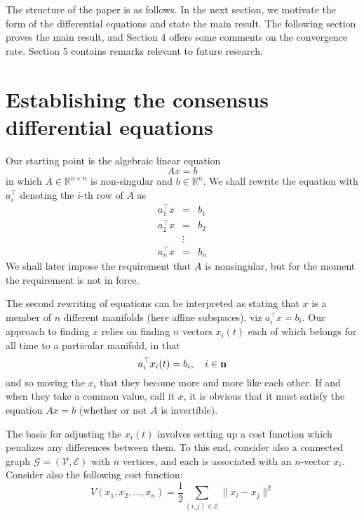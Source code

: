 \documentclass{aims}
\def\n{{\bf n}}
\begin{document}
The structure of the paper is as follows. In the next section, we motivate the form of the differential equations and state the main result.   The following section proves the main result, and Section 4 offers some comments on the convergence rate. Section 5 contains remarks relevant to future research.







\section{Establishing the consensus differential equations}

Our starting point is the algebraic linear equation
\begin{equation}
Ax=b
\end{equation}
in which $A\in\mathbb R^{n\times n}$ is non-singular and $b\in\mathbb R^n$. We shall rewrite the equation with $a_i^{\top}$ denoting the $i$-th row of $A$ as
\begin{eqnarray}
a_1^{\top}x&=&b_1\\
a_2^{\top}x&=&b_2\\
&\vdots&\\
a_n^{\top}x&=&b_n
\end{eqnarray}
 We shall later impose the requirement that $A$ is nonsingular, but for the moment the requirement is not in force.

The second rewriting of equations can be interpreted as stating that $x$ is a member of $n$ different manifolds (here affine subspaces), viz $a_i^{\top}x=b_i$.  Our approach to finding $x$ relies on finding $n$ vectors $x_i(t)$ each of which belongs for all time to a particular manifold, in that
\begin{equation}
a_i^{\top}x_i(t)=b_i, \quad i\in \n
\end{equation}
and so moving the $x_i$ that they become more and more like each other. If and when they take a common value,  call it $x$, it is obvious that it must satisfy the equation $Ax=b$ (whether or not $A$ is invertible).

The basis for adjusting the $x_i(t)$ involves setting up a cost function which penalizes any differences between them. To this end, consider also a connected graph $\mathcal G=(\mathcal V,\mathcal E)$ with $n$ vertices, and each is associated with an $n$-vector $x_i$.  Consider also the following cost function:
\begin{equation}
V(x_1,x_2,\ldots, x_n)=\frac{1}{2}\sum_{(i,j)\in\mathcal E}\|x_i-x_j\|^2
\end{equation}
\end{document}
